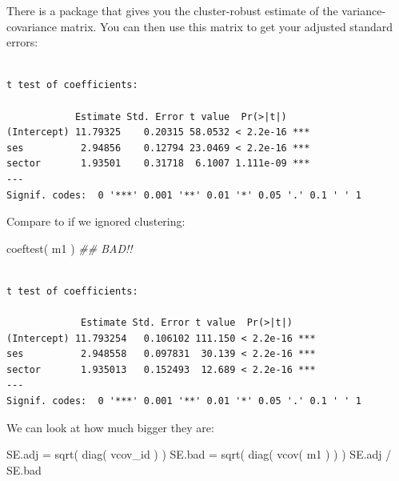 \documentclass[
  letterpaper,
  DIV=11,
  numbers=noendperiod]{scrreprt}
\newenvironment{Shaded}{\begin{snugshade}}{\end{snugshade}}
\newcommand{\AttributeTok}[1]{\textcolor[rgb]{0.49,0.56,0.16}{#1}}
\newcommand{\DocumentationTok}[1]{\textcolor[rgb]{0.73,0.13,0.13}{\textit{#1}}}
\newcommand{\FunctionTok}[1]{\textcolor[rgb]{0.02,0.16,0.49}{#1}}
\newcommand{\NormalTok}[1]{\textcolor[rgb]{0.00,0.44,0.13}{#1}}
\newcommand{\OtherTok}[1]{\textcolor[rgb]{0.00,0.44,0.13}{#1}}
\newcommand{\SpecialCharTok}[1]{\textcolor[rgb]{0.25,0.44,0.63}{#1}}
\begin{document}
There is a package that gives you the cluster-robust estimate of the
variance-covariance matrix. You can then use this matrix to get your
adjusted standard errors:

\begin{Shaded}
\end{Shaded}

\begin{verbatim}

t test of coefficients:

            Estimate Std. Error t value  Pr(>|t|)    
(Intercept) 11.79325    0.20315 58.0532 < 2.2e-16 ***
ses          2.94856    0.12794 23.0469 < 2.2e-16 ***
sector       1.93501    0.31718  6.1007 1.111e-09 ***
---
Signif. codes:  0 '***' 0.001 '**' 0.01 '*' 0.05 '.' 0.1 ' ' 1
\end{verbatim}

Compare to if we ignored clustering:

\begin{Shaded}
\begin{Highlighting}[]
\FunctionTok{coeftest}\NormalTok{( m1 )  }\DocumentationTok{\#\# BAD!!}
\end{Highlighting}
\end{Shaded}

\begin{verbatim}

t test of coefficients:

             Estimate Std. Error t value  Pr(>|t|)    
(Intercept) 11.793254   0.106102 111.150 < 2.2e-16 ***
ses          2.948558   0.097831  30.139 < 2.2e-16 ***
sector       1.935013   0.152493  12.689 < 2.2e-16 ***
---
Signif. codes:  0 '***' 0.001 '**' 0.01 '*' 0.05 '.' 0.1 ' ' 1
\end{verbatim}

We can look at how much bigger they are:

\begin{Shaded}
\begin{Highlighting}[]
\NormalTok{SE.adj }\OtherTok{=} \FunctionTok{sqrt}\NormalTok{( }\FunctionTok{diag}\NormalTok{( vcov\_id ) )}
\NormalTok{SE.bad }\OtherTok{=} \FunctionTok{sqrt}\NormalTok{( }\FunctionTok{diag}\NormalTok{( }\FunctionTok{vcov}\NormalTok{( m1 ) ) )}
\NormalTok{SE.adj }\SpecialCharTok{/}\NormalTok{ SE.bad}
\end{Highlighting}
\end{Shaded}
\end{document}
